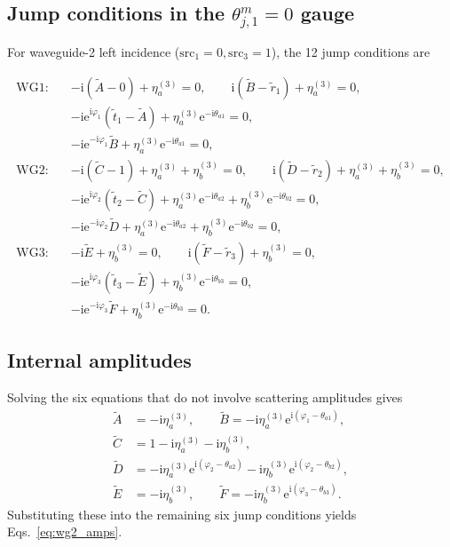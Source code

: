 \documentclass[aps,pra,reprint,superscriptaddress,nofootinbib,longbibliography,floatfix]{revtex4-2}
\newcommand{\ii}{\mathrm{i}}
\newcommand{\ee}{\mathrm{e}}
\newcommand{\ph}{\varphi}
\newcommand{\thaone}{\theta_{a1}}
\newcommand{\thatwo}{\theta_{a2}}
\newcommand{\thbtwo}{\theta_{b2}}
\newcommand{\thbthree}{\theta_{b3}}
\begin{document}
\subsection{\texorpdfstring{Jump conditions in the $\theta^m_{j,1}=0$ gauge}{Jump conditions in the theta gauge}}

For waveguide-2 left incidence ($\mathrm{src}_1=0,\mathrm{src}_3=1$), the 12 jump conditions are
\begin{widetext}
\begin{align}
\text{WG1:}\quad
&-\ii(\tilde A-0)+\eta_a^{(3)} = 0,\qquad
\ii(\tilde B-\tilde r_1)+\eta_a^{(3)} = 0, \nonumber\\
&-\ii\ee^{\ii\ph_1}(\tilde t_1-\tilde A)
  +\eta_a^{(3)}\ee^{-\ii\thaone} = 0,\nonumber\\
&-\ii\ee^{-\ii\ph_1}\tilde B
  +\eta_a^{(3)}\ee^{-\ii\thaone} = 0,\\[2pt]
\text{WG2:}\quad
&-\ii(\tilde C-1)+\eta_a^{(3)}+\eta_b^{(3)} = 0,\qquad
\ii(\tilde D-\tilde r_2)+\eta_a^{(3)}+\eta_b^{(3)} = 0, \nonumber\\
&-\ii\ee^{\ii\ph_2}(\tilde t_2-\tilde C)
  +\eta_a^{(3)}\ee^{-\ii\thatwo}
  +\eta_b^{(3)}\ee^{-\ii\thbtwo} = 0, \nonumber\\
&-\ii\ee^{-\ii\ph_2}\tilde D
  +\eta_a^{(3)}\ee^{-\ii\thatwo}
  +\eta_b^{(3)}\ee^{-\ii\thbtwo} = 0,\\[2pt]
\text{WG3:}\quad
&-\ii\tilde E+\eta_b^{(3)} = 0,\qquad
\ii(\tilde F-\tilde r_3)+\eta_b^{(3)} = 0, \nonumber\\
&-\ii\ee^{\ii\ph_3}(\tilde t_3-\tilde E)
  +\eta_b^{(3)}\ee^{-\ii\thbthree} = 0,\nonumber\\
&-\ii\ee^{-\ii\ph_3}\tilde F
  +\eta_b^{(3)}\ee^{-\ii\thbthree} = 0.
\end{align}
\end{widetext}

\subsection{Internal amplitudes}

Solving the six equations that do not involve scattering amplitudes gives
\begin{align}
\tilde A &= -\ii\eta_a^{(3)},\qquad
\tilde B = -\ii\eta_a^{(3)}\ee^{\ii(\ph_1-\thaone)},\nonumber\\
\tilde C &= 1 - \ii\eta_a^{(3)} - \ii\eta_b^{(3)},\nonumber\\
\tilde D &= -\ii\eta_a^{(3)}\ee^{\ii(\ph_2-\thatwo)}
           - \ii\eta_b^{(3)}\ee^{\ii(\ph_2-\thbtwo)},\nonumber\\
\tilde E &= -\ii\eta_b^{(3)},\qquad
\tilde F = -\ii\eta_b^{(3)}\ee^{\ii(\ph_3-\thbthree)}.
\end{align}
Substituting these into the remaining six jump conditions yields Eqs.~\eqref{eq:wg2_amps}.
\end{document}
